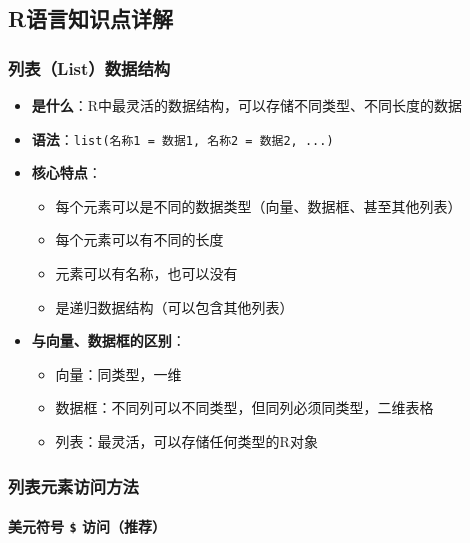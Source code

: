 \documentclass[
  twoside]{book}
\providecommand{\tightlist}{%
  \setlength{\itemsep}{0pt}\setlength{\parskip}{0pt}}
\begin{document}
\hypertarget{rux8bedux8a00ux77e5ux8bc6ux70b9ux8be6ux89e3-3}{%
\subsection{R语言知识点详解}\label{rux8bedux8a00ux77e5ux8bc6ux70b9ux8be6ux89e3-3}}

\hypertarget{ux5217ux8868listux6570ux636eux7ed3ux6784}{%
\subsubsection{列表（List）数据结构}\label{ux5217ux8868listux6570ux636eux7ed3ux6784}}

\begin{itemize}
\tightlist
\item
  \textbf{是什么}：R中最灵活的数据结构，可以存储不同类型、不同长度的数据
\item
  \textbf{语法}：\texttt{list(名称1\ =\ 数据1,\ 名称2\ =\ 数据2,\ ...)}
\item
  \textbf{核心特点}：

  \begin{itemize}
  \tightlist
  \item
    每个元素可以是不同的数据类型（向量、数据框、甚至其他列表）
  \item
    每个元素可以有不同的长度
  \item
    元素可以有名称，也可以没有
  \item
    是递归数据结构（可以包含其他列表）
  \end{itemize}
\item
  \textbf{与向量、数据框的区别}：

  \begin{itemize}
  \tightlist
  \item
    向量：同类型，一维
  \item
    数据框：不同列可以不同类型，但同列必须同类型，二维表格
  \item
    列表：最灵活，可以存储任何类型的R对象
  \end{itemize}
\end{itemize}

\hypertarget{ux5217ux8868ux5143ux7d20ux8bbfux95eeux65b9ux6cd5}{%
\subsubsection{列表元素访问方法}\label{ux5217ux8868ux5143ux7d20ux8bbfux95eeux65b9ux6cd5}}

\hypertarget{ux7f8eux5143ux7b26ux53f7-ux8bbfux95eeux63a8ux8350}{%
\paragraph{\texorpdfstring{美元符号 \texttt{\$} 访问（推荐）}{美元符号 \$ 访问（推荐）}}\label{ux7f8eux5143ux7b26ux53f7-ux8bbfux95eeux63a8ux8350}}
\end{document}
